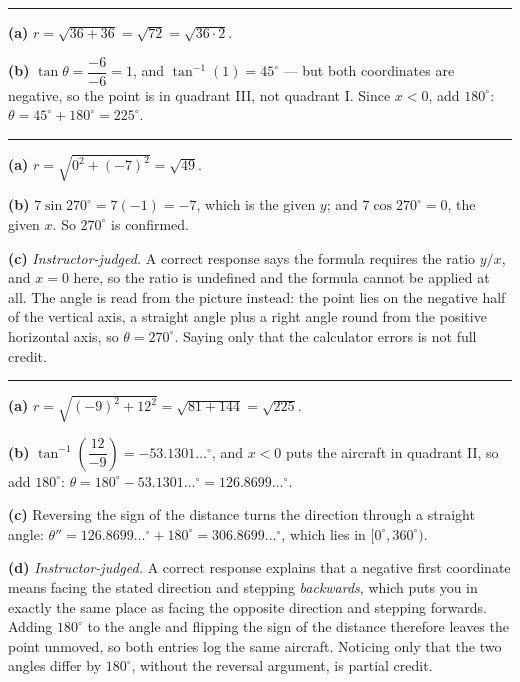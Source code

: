 \documentclass[12pt]{article}
\begin{document}
\vspace{0.12cm}\noindent\rule{\linewidth}{0.2pt}\vspace{0.12cm}


\textbf{(a)} $r = \sqrt{36 + 36} = \sqrt{72} = \sqrt{36 \cdot 2}$. 

\textbf{(b)} $\tan\theta = \dfrac{-6}{-6} = 1$, and $\tan^{-1}(1) = 45^\circ$ --- but both coordinates are negative, so the point is in quadrant III, not quadrant I. Since $x < 0$, add $180^\circ$: $\theta = 45^\circ + 180^\circ = 225^\circ$. 

\vspace{0.12cm}\noindent\rule{\linewidth}{0.2pt}\vspace{0.12cm}


\textbf{(a)} $r = \sqrt{0^2 + (-7)^2} = \sqrt{49}$. 

\textbf{(b)} $7\sin 270^\circ = 7(-1) = -7$, which is the given $y$; and $7\cos 270^\circ = 0$, the given $x$. So $270^\circ$ is confirmed. 

\textbf{(c)} \emph{Instructor-judged.} A correct response says the formula requires the ratio $y/x$, and $x = 0$ here, so the ratio is undefined and the formula cannot be applied at all. The angle is read from the picture instead: the point lies on the negative half of the vertical axis, a straight angle plus a right angle round from the positive horizontal axis, so $\theta = 270^\circ$. Saying only that the calculator errors is not full credit.

\vspace{0.12cm}\noindent\rule{\linewidth}{0.2pt}\vspace{0.12cm}


\textbf{(a)} $r = \sqrt{(-9)^2 + 12^2} = \sqrt{81 + 144} = \sqrt{225}$. 

\textbf{(b)} $\tan^{-1}\!\left(\dfrac{12}{-9}\right) = -53.1301\ldots^\circ$, and $x < 0$ puts the aircraft in quadrant II, so add $180^\circ$:
$\theta = 180^\circ - 53.1301\ldots^\circ = 126.8699\ldots^\circ$. 

\textbf{(c)} Reversing the sign of the distance turns the direction through a straight angle:
$\theta'' = 126.8699\ldots^\circ + 180^\circ = 306.8699\ldots^\circ$, which lies in $[0^\circ, 360^\circ)$. 

\textbf{(d)} \emph{Instructor-judged.} A correct response explains that a negative first coordinate means facing the stated direction and stepping \emph{backwards}, which puts you in exactly the same place as facing the opposite direction and stepping forwards. Adding $180^\circ$ to the angle and flipping the sign of the distance therefore leaves the point unmoved, so both entries log the same aircraft. Noticing only that the two angles differ by $180^\circ$, without the reversal argument, is partial credit.
\end{document}
